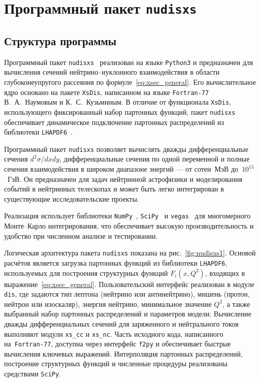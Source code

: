 \section{Программный пакет \texttt{nudisxs}}
\label{sec:nudisxs}
\subsection{Структура программы}
Программный пакет \texttt{nudisxs}~\cite{nudisxs2022} реализован на языке \texttt{Python3} и предназначен для вычисления сечений нейтрино–нуклонного взаимодействия в области глубоконеупругого рассеяния по формуле~\eqref{eq:xsec_general}. 
Его вычислительное ядро основано на пакете \texttt{XsDis}, написанном на языке \texttt{Fortran-77} В.~А.~Наумовым и К.~С.~Кузьминым. 
В отличие от функционала \texttt{XsDis}, использующего фиксированный набор партонных функций, пакет \texttt{nudisxs} обеспечивает динамическое подключение партонных распределений из библиотеки \texttt{LHAPDF6}~\cite{aartsenLHAPDF2020}.

Программный пакет \texttt{nudisxs} позволяет вычислять дважды дифференциальные сечения $d^2\sigma/dx dy$, дифференциальные сечения по одной переменной и полные сечения взаимодействия в широком диапазоне энергий — от сотен~МэВ до~$10^{15}$~ГэВ. 
Он предназначен для задач нейтринной астрофизики и моделирования событий в нейтринных телескопах и может быть легко интегрирован в существующие исследовательские проекты.

Реализация использует библиотеки \texttt{NumPy}~\cite{2020NumPy-Array}, \texttt{SciPy}~\cite{2020SciPy-NMeth} и \texttt{vegas}~\cite{lepageVegas2021} для многомерного Монте–Карло интегрирования, что обеспечивает высокую производительность и удобство при численном анализе и тестировании. 
%

Логическая архитектура пакета \texttt{nudisxs} показана на рис.~\ref{fig:nudisxs1}. 
Основой расчётов является загрузка партонных функций из библиотеки \texttt{LHAPDF6}, используемых для построения структурных функций $F_i(x, Q^2)$, входящих в выражение~\eqref{eq:xsec_general}. 
Пользовательский интерфейс реализован в модуле \texttt{dis}, где задаются тип лептона (нейтрино или антинейтрино), мишень (протон, нейтрон или изоскаляр), энергия нейтрино, минимальное значение $Q^2$, а также выбранный набор партонных распределений и параметров модели. 
Вычисление дважды дифференциальных сечений для заряженного и нейтрального токов выполняют модули \texttt{xs\_cc} и \texttt{xs\_nc}. 
Часть исходного кода, написанного на~\texttt{Fortran-77}, доступна через интерфейс \texttt{f2py} и обеспечивает быстрые вычисления ключевых выражений. 
Интерполяция партонных распределений, построение структурных функций и численные процедуры реализованы средствами \texttt{SciPy}.

